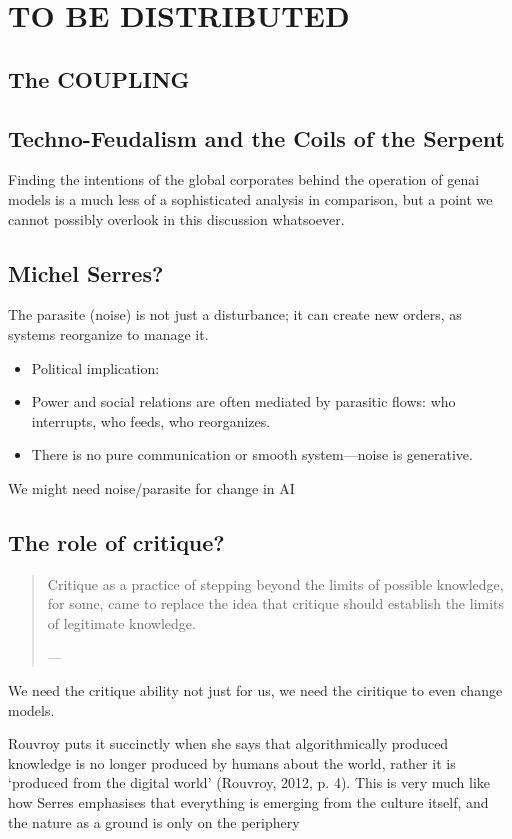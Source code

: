 \chapter{TO BE DISTRIBUTED}

\section{The COUPLING}


\section{Techno-Feudalism and the Coils of the Serpent}
Finding the intentions of the global corporates behind the operation of \gls{genai} models is a much less of a sophisticated analysis in comparison, but a point
we cannot possibly overlook in this discussion whatsoever.


\section{Michel Serres?}


The parasite (noise) is not just a disturbance; it can create new orders, as systems reorganize to manage it.
\begin{itemize}
	\item Political implication:
	\item Power and social relations are often mediated by parasitic flows: who interrupts, who feeds, who reorganizes.
	\item There is no pure communication or smooth system—noise is generative.

\end{itemize}

We might need noise/parasite for change in AI

\section{The role of critique?}

\begin{quote}
	Critique as a practice of stepping beyond the limits of possible  knowledge, for some, came to replace the idea that critique should establish the  limits of legitimate knowledge.

	— \cite[17]{mackenzie2021}
\end{quote}

We need the critique ability not just for us, we need the ciritique to even
change models.

Rouvroy puts it succinctly when she says that  algorithmically produced knowledge is no longer produced by humans about the world, rather it is ‘produced from the digital world’ (Rouvroy, 2012, p. 4). This is very much like how Serres emphasises that everything is emerging from the culture itself, and the nature as a ground is only on the periphery
